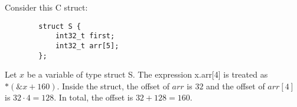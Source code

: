 \begin{example}
    Consider this C struct:
    \begin{verbatim}
        struct S {
            int32_t first;
            int32_t arr[5];
        };
    \end{verbatim}
    Let $x$ be a variable of type \textsf{struct S}.
    The expression \textsf{x.arr[4]} is treated as $*(\&x + 160)$.
    Inside the struct, the offset of $arr$ is $32$ and the offset of $arr[4]$ is $32\cdot 4 = 128$.
    In total, the offset is $32 + 128 = 160$.
\end{example}
